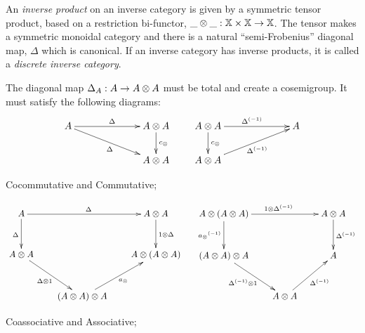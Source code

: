 \begin{definition}\label{def:inverse_product}
  An \emph{inverse product} on an inverse category \X is given by a symmetric tensor product, based
  on a restriction  bi-functor, $\_\otimes\_:\mathbb{X}\times\mathbb{X} \to \mathbb{X}$. The tensor makes \X a  symmetric
  monoidal category and there is a natural  ``semi-Frobenius'' diagonal map, $\Delta$ which is canonical.   If an
  inverse category has inverse products, it is called  a \emph{discrete inverse category}.


  The diagonal map $\Delta_A:A \to A\otimes A$ must be total and create a cosemigroup. It
  must satisfy the following diagrams:
  \[
    \xymatrix @!0 @C=90pt @R=35pt{
      A \ar[dr]_{\Delta} \ar[r]^{\Delta} &
      A \* A \ar[d]^{c_{\*}}\\
      & A \* A
    }\qquad
    \xymatrix @!0 @C=90pt @R=35pt{
      A \* A \ar[d]^{c_{\*}} \ar[r]^{\inv{\Delta}}  & A\\
      A \* A  \ar[ur]_{\inv{\Delta}}
    }
  \]
\begin{center}Cocommutative and Commutative;\end{center}

  \[
    \xymatrix @C=20pt @R=30pt{
      A \ar[rr]^{\Delta} \ar[d]_{\Delta} & &
      A \* A \ar[d]^{1\*\Delta}\\
      A\*A \ar[dr]_{\Delta \* 1}& &
      A \* ( A \* A) \\
      &   (A \* A) \* A \ar[ur]_{a_{\*}}
    }\ \quad
    \xymatrix @C=20pt @R=30pt{
      A\*(A\*A) \ar[rr]^{1\*\idelta} \ar[d]_{\inv{a_\*}} && A\*A \ar[d]^{\idelta}\\
      (A\*A)\*A \ar[dr]_{\idelta\*1}&&A\\
     & A\*A \ar[ur]_{\idelta}
    }
  \]
\begin{center}Coassociative and Associative;\end{center}



\end{definition}
